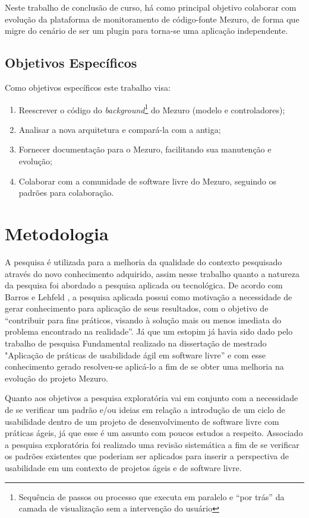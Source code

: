 Neste trabalho de conclusão de curso, há como principal objetivo colaborar com evolução da plataforma de monitoramento de código-fonte Mezuro, de forma que migre do cenário de ser um plugin para torna-se uma aplicação independente.

\subsection{Objetivos Específicos}

Como objetivos específicos este trabalho visa:

\begin{enumerate}
\item Reescrever o código do \textit{background}\footnote{Sequência de passos ou processo que executa em paralelo e ``por trás'' da camada de visualização sem a intervenção do usuário} do Mezuro (modelo e controladores);
\item Analisar a nova arquitetura e compará-la com a antiga;
\item Fornecer documentação para o Mezuro, facilitando sua manutenção e evolução;
\item Colaborar com a comunidade de software livre do Mezuro, seguindo os padrões para colaboração.
\end{enumerate}

\section{Metodologia}

A pesquisa é utilizada para a melhoria da qualidade do contexto pesquisado através do novo conhecimento adquirido, assim nesse trabalho quanto a natureza da pesquisa foi abordado a pesquisa aplicada ou tecnológica. De acordo com Barros e Lehfeld \citeyear{barros2000}, a pesquisa aplicada possui como motivação a necessidade de gerar conhecimento para aplicação de seus resultados, com o objetivo de “contribuir para fins práticos, visando à solução mais ou menos imediata do problema encontrado na realidade”. Já que um estopim já havia sido dado pelo trabalho de pesquisa Fundamental realizado na dissertação de mestrado "Aplicação de práticas de usabilidade ágil em software livre” \cite{santos2012} e com esse conhecimento gerado resolveu-se aplicá-lo a fim de se obter uma melhoria na evolução do projeto Mezuro.

Quanto aos objetivos a pesquisa exploratória vai em conjunto com a necessidade de se verificar um padrão e/ou ideias em relação a introdução de um ciclo de usabilidade dentro de um projeto de desenvolvimento de software livre com práticas ágeis, já que esse é um assunto com poucos estudos a respeito. Associado a pesquisa exploratória foi realizado uma revisão sistemática a fim de se verificar os padrões existentes que poderiam ser aplicados para inserir a perspectiva de usabilidade em um contexto de projetos ágeis e de software livre.

